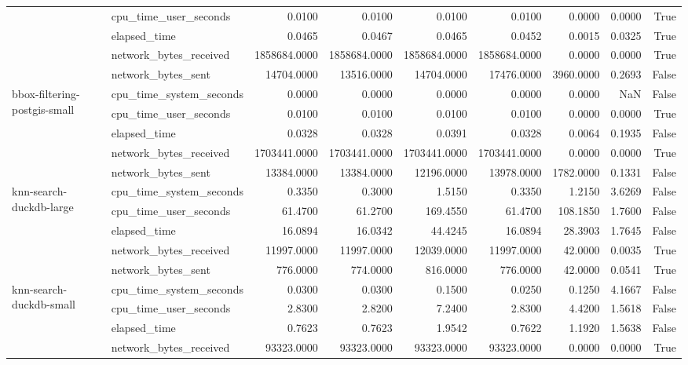 \begin{tabular}{llrrrrrrr}
 & cpu\_time\_user\_seconds & 0.0100 & 0.0100 & 0.0100 & 0.0100 & 0.0000 & 0.0000 & True \\
 & elapsed\_time & 0.0465 & 0.0467 & 0.0465 & 0.0452 & 0.0015 & 0.0325 & True \\
 & network\_bytes\_received & 1858684.0000 & 1858684.0000 & 1858684.0000 & 1858684.0000 & 0.0000 & 0.0000 & True \\
 & network\_bytes\_sent & 14704.0000 & 13516.0000 & 14704.0000 & 17476.0000 & 3960.0000 & 0.2693 & False \\
\cline{1-9}
\multirow[t]{5}{*}{bbox-filtering-postgis-small} & cpu\_time\_system\_seconds & 0.0000 & 0.0000 & 0.0000 & 0.0000 & 0.0000 & NaN & False \\
 & cpu\_time\_user\_seconds & 0.0100 & 0.0100 & 0.0100 & 0.0100 & 0.0000 & 0.0000 & True \\
 & elapsed\_time & 0.0328 & 0.0328 & 0.0391 & 0.0328 & 0.0064 & 0.1935 & False \\
 & network\_bytes\_received & 1703441.0000 & 1703441.0000 & 1703441.0000 & 1703441.0000 & 0.0000 & 0.0000 & True \\
 & network\_bytes\_sent & 13384.0000 & 13384.0000 & 12196.0000 & 13978.0000 & 1782.0000 & 0.1331 & False \\
\cline{1-9}
\multirow[t]{5}{*}{knn-search-duckdb-large} & cpu\_time\_system\_seconds & 0.3350 & 0.3000 & 1.5150 & 0.3350 & 1.2150 & 3.6269 & False \\
 & cpu\_time\_user\_seconds & 61.4700 & 61.2700 & 169.4550 & 61.4700 & 108.1850 & 1.7600 & False \\
 & elapsed\_time & 16.0894 & 16.0342 & 44.4245 & 16.0894 & 28.3903 & 1.7645 & False \\
 & network\_bytes\_received & 11997.0000 & 11997.0000 & 12039.0000 & 11997.0000 & 42.0000 & 0.0035 & True \\
 & network\_bytes\_sent & 776.0000 & 774.0000 & 816.0000 & 776.0000 & 42.0000 & 0.0541 & True \\
\cline{1-9}
\multirow[t]{5}{*}{knn-search-duckdb-small} & cpu\_time\_system\_seconds & 0.0300 & 0.0300 & 0.1500 & 0.0250 & 0.1250 & 4.1667 & False \\
 & cpu\_time\_user\_seconds & 2.8300 & 2.8200 & 7.2400 & 2.8300 & 4.4200 & 1.5618 & False \\
 & elapsed\_time & 0.7623 & 0.7623 & 1.9542 & 0.7622 & 1.1920 & 1.5638 & False \\
 & network\_bytes\_received & 93323.0000 & 93323.0000 & 93323.0000 & 93323.0000 & 0.0000 & 0.0000 & True \\

\end{tabular}
